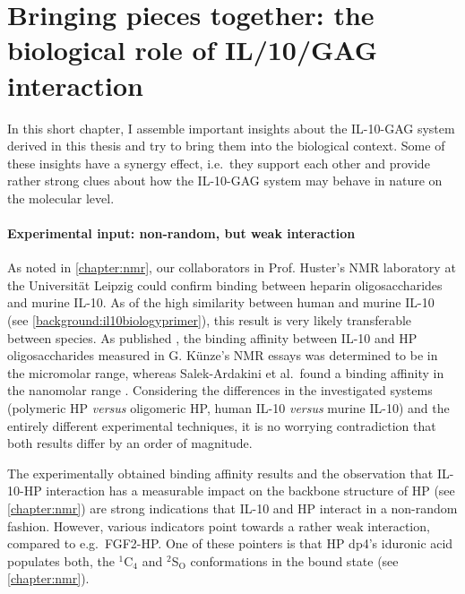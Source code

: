 \chapter{Bringing pieces together: the biological role of IL\-/10\-/GAG interaction}
\label{together}

In this short chapter, I assemble important insights about the IL-10-GAG system
derived in this thesis and try to bring them into the biological context. Some
of these insights have a synergy effect, i.e.\ they support each other and
provide rather strong clues about how the IL-10-GAG system may behave in nature
on the molecular level.


\subsubsection{Experimental input: non-random, but weak interaction}

As noted in \cref{chapter:nmr}, our collaborators in Prof. Huster's NMR
laboratory at the Universität Leipzig could confirm binding between heparin
oligosaccharides and murine IL-10. As of the high similarity between human and
murine IL-10 (see \cref{background:il10biologyprimer}), this result is very
likely transferable between species. As published \cite{kuenze_gehrcke_2014},
the binding affinity between IL-10 and HP oligosaccharides measured in G.
Künze's NMR essays was determined to be in the micromolar range, whereas
Salek-Ardakini et al.\ found a binding affinity in the nanomolar range
\cite{salek_ardakani_2000}. Considering the differences in the investigated
systems (polymeric HP \textit{versus} oligomeric HP, human IL-10 \textit{versus}
murine IL-10) and the entirely different experimental techniques, it is no
worrying contradiction that both results differ by an order of magnitude.

The experimentally obtained binding affinity results and the observation that
IL-10-HP interaction has a measurable impact on the backbone structure of HP
(see \cref{chapter:nmr}) are strong indications that IL-10 and HP interact in a
non-random fashion. However, various indicators point towards a rather weak
interaction, compared to e.g.\ FGF2-HP. One of these pointers is that HP dp4's
iduronic acid populates both, the ${}^1$C${}_4$ and ${}^2$S${}_\mathrm{O}$
conformations in the bound state (see \cref{chapter:nmr}).


